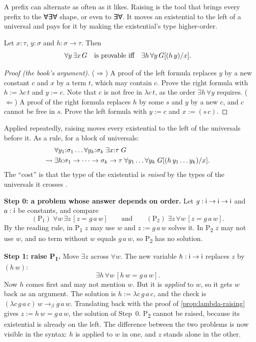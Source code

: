 {A prefix can alternate as often as it likes. Raising is the tool that brings every prefix to the
∀∃∀ shape, or even to ∃∀. It moves an existential to the left of a universal and pays for it by making
the existential's type higher-order.

\begin{proposition}\label{prop:lambda-raising}
Let $x:\tau$, $y:\sigma$ and $h:\sigma\to\tau$. Then
\[
  \forall y\,\exists x\,G\quad\text{is provable iff}\quad\exists h\,\forall y\,G[(h\,y)/x].
\]
\end{proposition}
\begin{proof}[Proof (the book's argument)]
($\Rightarrow$) A proof of the left formula replaces $y$ by a new constant $c$ and $x$ by a term $t$,
which may contain $c$. Prove the right formula with $h:=\lambda c\,t$ and $y:=c$. Note that $c$ is not
free in $\lambda c\,t$, as the order $\exists h\,\forall y$ requires. ($\Leftarrow$) A proof of the right
formula replaces $h$ by some $s$ and $y$ by a new $c$, and $c$ cannot be free in $s$. Prove the left
formula with $y:=c$ and $x:=(s\,c)$.
\end{proof}

Applied repeatedly, raising moves every existential to the left of the universals before it. As a rule,
for a block of universals:
\[
\begin{aligned}
  &\forall y_1{:}\sigma_1\dots\forall y_k{:}\sigma_k\;\exists x{:}\tau\;G\\
  \rightsquigarrow\;&
  \exists h{:}\sigma_1\to\dots\to\sigma_k\to\tau\;\forall y_1\dots\forall y_k\;G[(h\,y_1\dots y_k)/x].
\end{aligned}
\]
The \enquote{cost} is that the type of the existential is \emph{raised} by the types of the universals it
crosses .

\begin{tutorial}
\textbf{Step 0: a problem whose answer depends on order.} Let $g:\mathsf{i}\to\mathsf{i}\to\mathsf{i}$ and
$a:\mathsf{i}$ be constants, and compare
\[
  (\mathrm{P}_1)\;\forall w\,\exists z\,[z=g\,a\,w]
  \qquad\text{and}\qquad
  (\mathrm{P}_2)\;\exists z\,\forall w\,[z=g\,a\,w].
\]
By the reading rule, in P\textsubscript{1} $z$ may use $w$ and $z:=g\,a\,w$ solves it. In
P\textsubscript{2} $z$ may not use $w$, and no term without $w$ equals $g\,a\,w$, so P\textsubscript{2}
has no solution.

\textbf{Step 1: raise P\textsubscript{1}.} Move $\exists z$ across $\forall w$. The new variable
$h:\mathsf{i}\to\mathsf{i}$ replaces $z$ by $(h\,w)$:
\[
  \exists h\,\forall w\,[h\,w=g\,a\,w].
\]
Now $h$ comes first and may not mention $w$. But it is \emph{applied} to $w$, so it gets $w$ back as an
argument. The solution is $h:=\lambda c\,g\,a\,c$, and the check is $(\lambda c\,g\,a\,c)\,w\to_\beta g\,a\,w$.
Translating back with the proof of \cref{prop:lambda-raising} gives $z:=h\,w=g\,a\,w$, the solution of
Step~0. P\textsubscript{2} cannot be raised, because its existential is already on the left. The
difference between the two problems is now visible in the syntax: $h$ is applied to $w$ in one, and
$z$ stands alone in the other.


\end{tutorial}}
